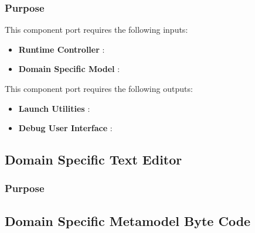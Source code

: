 \documentclass{gemoc} %
\begin{document}

\subsubsection{Purpose}

This component port requires the following inputs:
\begin{itemize}
  \item \textbf{Runtime Controller} :
  \item \textbf{Domain Specific Model} :
\end{itemize}

This component port requires the following outputs:
\begin{itemize}
  \item \textbf{Launch Utilities} :
  \item \textbf{Debug User Interface} :
\end{itemize}

\subsection{Domain Specific Text Editor}


\subsubsection{Purpose}



\subsection{Domain Specific Metamodel Byte Code}

\end{document}
